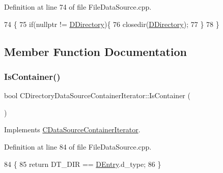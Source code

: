 Definition at line 74 of file File\+Data\+Source.\+cpp.


\begin{DoxyCode}
74                                                                              \{
75     \textcolor{keywordflow}{if}(\textcolor{keyword}{nullptr} != \hyperlink{classCDirectoryDataSourceContainerIterator_a0e07044b1a916e3dd931ae0778317e16}{DDirectory})\{
76         closedir(\hyperlink{classCDirectoryDataSourceContainerIterator_a0e07044b1a916e3dd931ae0778317e16}{DDirectory});
77     \}
78 \}
\end{DoxyCode}


\subsection{Member Function Documentation}
\hypertarget{classCDirectoryDataSourceContainerIterator_a5430df3036bfd75734ffb807b888b208}{}\label{classCDirectoryDataSourceContainerIterator_a5430df3036bfd75734ffb807b888b208} 
\subsubsection{\texorpdfstring{Is\+Container()}{IsContainer()}}
{\footnotesize\ttfamily bool C\+Directory\+Data\+Source\+Container\+Iterator\+::\+Is\+Container (\begin{DoxyParamCaption}{ }\end{DoxyParamCaption})\hspace{0.3cm}{\ttfamily [virtual]}}



Implements \hyperlink{classCDataSourceContainerIterator_aafcccb5733f936b03e1930b09c02df87}{C\+Data\+Source\+Container\+Iterator}.



Definition at line 84 of file File\+Data\+Source.\+cpp.


\begin{DoxyCode}
84                                                        \{
85     \textcolor{keywordflow}{return} DT\_DIR == \hyperlink{classCDirectoryDataSourceContainerIterator_a69dfb8a9f2ab7f71e7d106d4d6c0e29b}{DEntry}.d\_type;
86 \}
\end{DoxyCode}
\hypertarget{classCDirectoryDataSourceContainerIterator_ab89d8af808bff115ac7c096bbec23188}{}\label{classCDirectoryDataSourceContainerIterator_ab89d8af808bff115ac7c096bbec23188} 
